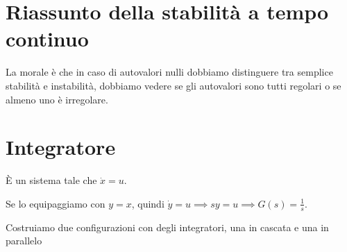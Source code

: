 \section{Riassunto della stabilità a tempo continuo}


La morale è che in caso di autovalori nulli dobbiamo distinguere tra semplice stabilità e instabilità, dobbiamo vedere se gli autovalori sono tutti regolari o se almeno uno è irregolare.

\section{Integratore}

È un sistema tale che $\dot{x} =u$.

Se lo equipaggiamo con $y=x$, quindi $\dot{y} =u\implies sy=u\implies \boxed{G\left(s\right) =\frac{1}{s}}$.

Costruiamo due configurazioni con degli integratori, una in cascata e una in parallelo

